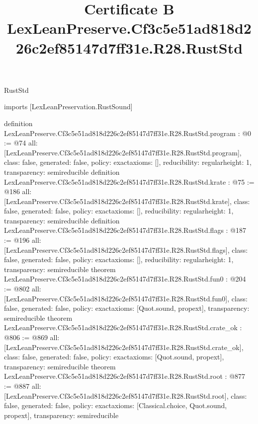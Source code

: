 \begin{lexlean}{RustStd}
\title{Certificate B LexLeanPreserve.Cf3c5e51ad818d226c2ef85147d7ff31e.R28.RustStd}
\begin{coremodule}
imports [LexLeanPreservation.RustSound]

definition LexLeanPreserve.Cf3c5e51ad818d226c2ef85147d7ff31e.R28.RustStd.program : @0 := @74 {
  all: [LexLeanPreserve.Cf3c5e51ad818d226c2ef85147d7ff31e.R28.RustStd.program],
  class: false,
  generated: false,
  policy: exact{axioms: []},
  reducibility: regular{height: 1},
  transparency: semireducible
}
definition LexLeanPreserve.Cf3c5e51ad818d226c2ef85147d7ff31e.R28.RustStd.krate : @75 := @186 {
  all: [LexLeanPreserve.Cf3c5e51ad818d226c2ef85147d7ff31e.R28.RustStd.krate],
  class: false,
  generated: false,
  policy: exact{axioms: []},
  reducibility: regular{height: 1},
  transparency: semireducible
}
definition LexLeanPreserve.Cf3c5e51ad818d226c2ef85147d7ff31e.R28.RustStd.flags : @187 := @196 {
  all: [LexLeanPreserve.Cf3c5e51ad818d226c2ef85147d7ff31e.R28.RustStd.flags],
  class: false,
  generated: false,
  policy: exact{axioms: []},
  reducibility: regular{height: 1},
  transparency: semireducible
}
theorem LexLeanPreserve.Cf3c5e51ad818d226c2ef85147d7ff31e.R28.RustStd.fun0 : @204 := @802 {
  all: [LexLeanPreserve.Cf3c5e51ad818d226c2ef85147d7ff31e.R28.RustStd.fun0],
  class: false,
  generated: false,
  policy: exact{axioms: [Quot.sound, propext]},
  transparency: semireducible
}
theorem LexLeanPreserve.Cf3c5e51ad818d226c2ef85147d7ff31e.R28.RustStd.crate_ok : @806 := @869 {
  all: [LexLeanPreserve.Cf3c5e51ad818d226c2ef85147d7ff31e.R28.RustStd.crate_ok],
  class: false,
  generated: false,
  policy: exact{axioms: [Quot.sound, propext]},
  transparency: semireducible
}
theorem LexLeanPreserve.Cf3c5e51ad818d226c2ef85147d7ff31e.R28.RustStd.root : @877 := @887 {
  all: [LexLeanPreserve.Cf3c5e51ad818d226c2ef85147d7ff31e.R28.RustStd.root],
  class: false,
  generated: false,
  policy: exact{axioms: [Classical.choice, Quot.sound, propext]},
  transparency: semireducible
}


\end{coremodule}
\end{lexlean}
